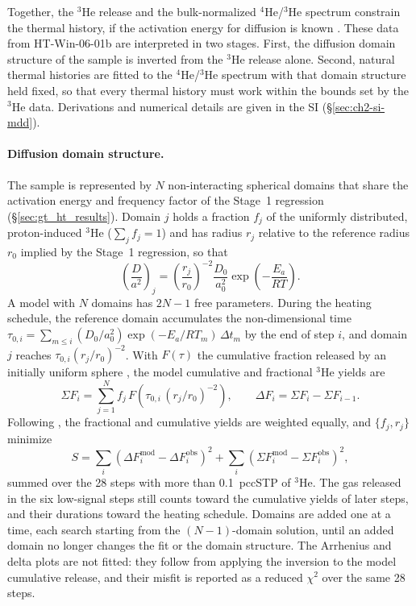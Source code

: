Together, the $^3$He release and the bulk-normalized $^4$He/$^3$He spectrum constrain the thermal history, if the activation energy 
for diffusion is known \citep{farleyflowers2012}.
These data from HT-Win-06-01b are interpreted in two stages. First, the diffusion domain structure of the sample is inverted
from the $^3$He release alone. Second, natural thermal histories are fitted to the
$^4$He/$^3$He spectrum with that domain structure held fixed, so that every thermal history
must work within the bounds set by the $^3$He data. 
Derivations and numerical details are given in the SI (\S\ref{sec:ch2-si-mdd}).

\paragraph{Diffusion domain structure.} The sample is represented by $N$ non-interacting
spherical domains that share the activation energy and frequency factor of the Stage~1
regression (\S\ref{sec:gt_ht_results}). Domain $j$ holds a fraction $f_j$ of the uniformly
distributed, proton-induced $^3$He ($\sum_j f_j=1$) and has radius $r_j$ relative to the
reference radius $r_0$ implied by the Stage~1 regression, so that
\begin{equation}
  \left(\frac{D}{a^2}\right)_j = \left(\frac{r_j}{r_0}\right)^{-2}\frac{D_0}{a_0^2}\exp\!\left(-\frac{E_a}{RT}\right).
  \label{eq:gt_mdd_domain}
\end{equation}
A model with $N$ domains has $2N-1$ free parameters. During the heating schedule, the
reference domain accumulates the non-dimensional time
$\tau_{0,i}=\sum_{m\le i}(D_0/a_0^2)\exp(-E_a/RT_m)\,\Delta t_m$ by the end of step $i$, and
domain $j$ reaches $\tau_{0,i}(r_j/r_0)^{-2}$. With $F(\tau)$ the cumulative fraction released
by an initially uniform sphere \citep{crank1979}, the model cumulative and fractional
$^3$He yields are
\begin{equation}
  \Sigma F_i=\sum_{j=1}^{N}f_j\,F\!\left(\tau_{0,i}\,(r_j/r_0)^{-2}\right),\qquad
  \Delta F_i=\Sigma F_i-\Sigma F_{i-1}.
  \label{eq:gt_mdd_mix}
\end{equation}
Following \citet{farleyflowers2012}, the fractional and cumulative yields are weighted
equally, and $\{f_j,r_j\}$ minimize
\begin{equation}
  S=\sum_i\left(\Delta F_i^{\mathrm{mod}}-\Delta F_i^{\mathrm{obs}}\right)^2
   +\sum_i\left(\Sigma F_i^{\mathrm{mod}}-\Sigma F_i^{\mathrm{obs}}\right)^2,
  \label{eq:gt_mdd_S}
\end{equation}
summed over the 28 steps with more than 0.1~pccSTP of $^3$He. The gas released in the six
low-signal steps still counts toward the cumulative yields of later steps, and their
durations toward the heating schedule. Domains are added one at a time, each search
starting from the $(N-1)$-domain solution, until an added domain no longer changes the fit
or the domain structure. The Arrhenius and delta plots are not fitted: they follow from
applying the \citet{fechtigkalbitzer1966} inversion to the model cumulative release, and
their misfit is reported as a reduced $\chi^2$ over the same 28 steps.


